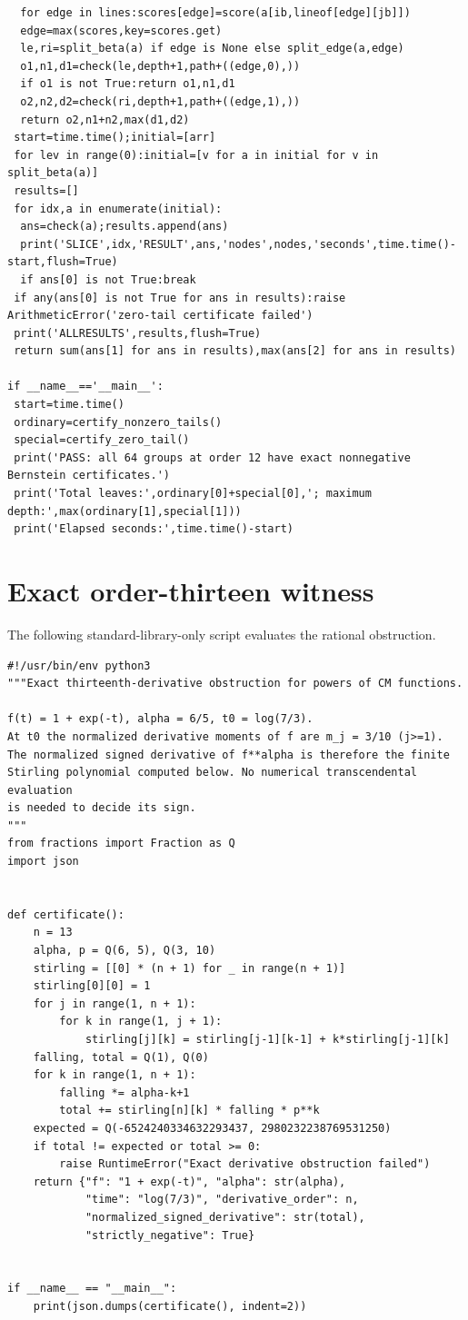 \documentclass[11pt]{article}
\begin{document}
\begin{lstlisting}
  for edge in lines:scores[edge]=score(a[ib,lineof[edge][jb]])
  edge=max(scores,key=scores.get)
  le,ri=split_beta(a) if edge is None else split_edge(a,edge)
  o1,n1,d1=check(le,depth+1,path+((edge,0),))
  if o1 is not True:return o1,n1,d1
  o2,n2,d2=check(ri,depth+1,path+((edge,1),))
  return o2,n1+n2,max(d1,d2)
 start=time.time();initial=[arr]
 for lev in range(0):initial=[v for a in initial for v in split_beta(a)]
 results=[]
 for idx,a in enumerate(initial):
  ans=check(a);results.append(ans)
  print('SLICE',idx,'RESULT',ans,'nodes',nodes,'seconds',time.time()-start,flush=True)
  if ans[0] is not True:break
 if any(ans[0] is not True for ans in results):raise ArithmeticError('zero-tail certificate failed')
 print('ALLRESULTS',results,flush=True)
 return sum(ans[1] for ans in results),max(ans[2] for ans in results)

if __name__=='__main__':
 start=time.time()
 ordinary=certify_nonzero_tails()
 special=certify_zero_tail()
 print('PASS: all 64 groups at order 12 have exact nonnegative Bernstein certificates.')
 print('Total leaves:',ordinary[0]+special[0],'; maximum depth:',max(ordinary[1],special[1]))
 print('Elapsed seconds:',time.time()-start)
\end{lstlisting}

\section{Exact order-thirteen witness}\label{app:13}
The following standard-library-only script evaluates the rational obstruction.
\begin{lstlisting}
#!/usr/bin/env python3
"""Exact thirteenth-derivative obstruction for powers of CM functions.

f(t) = 1 + exp(-t), alpha = 6/5, t0 = log(7/3).
At t0 the normalized derivative moments of f are m_j = 3/10 (j>=1).
The normalized signed derivative of f**alpha is therefore the finite
Stirling polynomial computed below. No numerical transcendental evaluation
is needed to decide its sign.
"""
from fractions import Fraction as Q
import json


def certificate():
    n = 13
    alpha, p = Q(6, 5), Q(3, 10)
    stirling = [[0] * (n + 1) for _ in range(n + 1)]
    stirling[0][0] = 1
    for j in range(1, n + 1):
        for k in range(1, j + 1):
            stirling[j][k] = stirling[j-1][k-1] + k*stirling[j-1][k]
    falling, total = Q(1), Q(0)
    for k in range(1, n + 1):
        falling *= alpha-k+1
        total += stirling[n][k] * falling * p**k
    expected = Q(-6524240334632293437, 2980232238769531250)
    if total != expected or total >= 0:
        raise RuntimeError("Exact derivative obstruction failed")
    return {"f": "1 + exp(-t)", "alpha": str(alpha),
            "time": "log(7/3)", "derivative_order": n,
            "normalized_signed_derivative": str(total),
            "strictly_negative": True}


if __name__ == "__main__":
    print(json.dumps(certificate(), indent=2))
\end{lstlisting}
\end{document}
